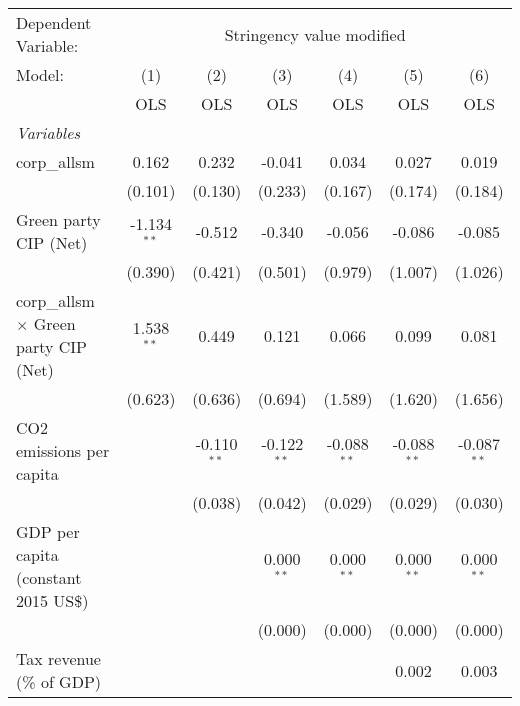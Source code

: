 
\begingroup
\centering
\begin{tabular}{lcccccc}
   \toprule
   Dependent Variable: & \multicolumn{6}{c}{Stringency value modified}\\
   Model:                                       & (1)           & (2)           & (3)           & (4)           & (5)           & (6)\\  
                                                &  OLS          & OLS           & OLS           & OLS           & OLS           & OLS\\  
   \midrule
   \emph{Variables}\\
   corp\_allsm                                  & 0.162         & 0.232         & -0.041        & 0.034         & 0.027         & 0.019\\   
                                                & (0.101)       & (0.130)       & (0.233)       & (0.167)       & (0.174)       & (0.184)\\   
   Green party CIP (Net)                        & -1.134$^{**}$ & -0.512        & -0.340        & -0.056        & -0.086        & -0.085\\   
                                                & (0.390)       & (0.421)       & (0.501)       & (0.979)       & (1.007)       & (1.026)\\   
   corp\_allsm $\times$ Green party CIP (Net)   & 1.538$^{**}$  & 0.449         & 0.121         & 0.066         & 0.099         & 0.081\\   
                                                & (0.623)       & (0.636)       & (0.694)       & (1.589)       & (1.620)       & (1.656)\\   
   CO2 emissions per capita                     &               & -0.110$^{**}$ & -0.122$^{**}$ & -0.088$^{**}$ & -0.088$^{**}$ & -0.087$^{**}$\\   
                                                &               & (0.038)       & (0.042)       & (0.029)       & (0.029)       & (0.030)\\   
   GDP per capita (constant 2015 US\$)          &               &               & 0.000$^{**}$  & 0.000$^{**}$  & 0.000$^{**}$  & 0.000$^{**}$\\   
                                                &               &               & (0.000)       & (0.000)       & (0.000)       & (0.000)\\   
   Tax revenue (\% of GDP)                      &               &               &               &               & 0.002         & 0.003\\   

\end{tabular}
